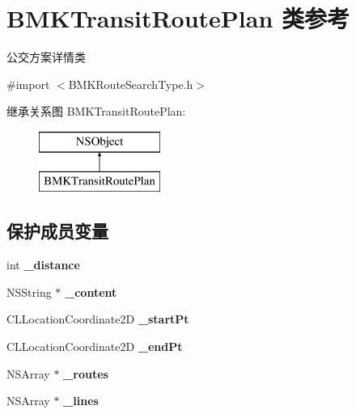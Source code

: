 \hypertarget{interface_b_m_k_transit_route_plan}{\section{B\-M\-K\-Transit\-Route\-Plan 类参考}
\label{interface_b_m_k_transit_route_plan}
}


公交方案详情类  




{\ttfamily \#import $<$B\-M\-K\-Route\-Search\-Type.\-h$>$}

继承关系图 B\-M\-K\-Transit\-Route\-Plan\-:\begin{figure}[H]
\begin{center}
\leavevmode
\includegraphics[height=2.000000cm]{interface_b_m_k_transit_route_plan}
\end{center}
\end{figure}
\subsection*{保护成员变量}
\begin{DoxyCompactItemize}
\item 
\hypertarget{interface_b_m_k_transit_route_plan_a60d824279339819c63dd3250e521e0c2}{int {\bfseries \-\_\-distance}}\label{interface_b_m_k_transit_route_plan_a60d824279339819c63dd3250e521e0c2}

\item 
\hypertarget{interface_b_m_k_transit_route_plan_a0c6a25bc877f5cb7be4031bcc3b41102}{N\-S\-String $\ast$ {\bfseries \-\_\-content}}\label{interface_b_m_k_transit_route_plan_a0c6a25bc877f5cb7be4031bcc3b41102}

\item 
\hypertarget{interface_b_m_k_transit_route_plan_abadaa366d74590f06156787fef1b66d0}{C\-L\-Location\-Coordinate2\-D {\bfseries \-\_\-start\-Pt}}\label{interface_b_m_k_transit_route_plan_abadaa366d74590f06156787fef1b66d0}

\item 
\hypertarget{interface_b_m_k_transit_route_plan_ad5a3329c1ea2831c13ec5aba78815504}{C\-L\-Location\-Coordinate2\-D {\bfseries \-\_\-end\-Pt}}\label{interface_b_m_k_transit_route_plan_ad5a3329c1ea2831c13ec5aba78815504}

\item 
\hypertarget{interface_b_m_k_transit_route_plan_a9353aa1b87321aad2492b57f801e3116}{N\-S\-Array $\ast$ {\bfseries \-\_\-routes}}\label{interface_b_m_k_transit_route_plan_a9353aa1b87321aad2492b57f801e3116}

\item 
\hypertarget{interface_b_m_k_transit_route_plan_aded38ebf485757a37633a026e503c999}{N\-S\-Array $\ast$ {\bfseries \-\_\-lines}}\label{interface_b_m_k_transit_route_plan_aded38ebf485757a37633a026e503c999}

\end{DoxyCompactItemize}
